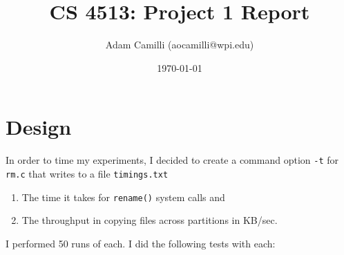 \documentclass[10pt]{article}
\begin{document}
\title{CS 4513: Project 1 Report}
\author{Adam Camilli (aocamilli@wpi.edu)}
\date{\today}
\maketitle

\section*{Design}
In order to time my experiments, I decided to create a command option \texttt{-t} for \texttt{rm.c} that writes to a file \texttt{timings.txt}
\begin{enumerate}
\item The time it takes for \texttt{rename()} system calls and
\item The throughput in copying files across partitions in KB/sec.
\end{enumerate}
I performed 50 runs of each. I did the following tests with each:
\end{document}
